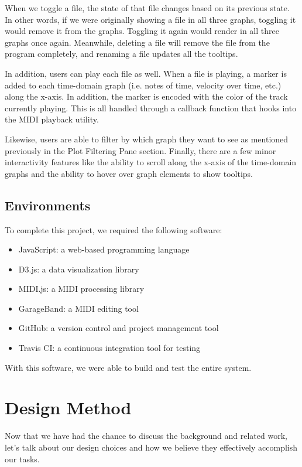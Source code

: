 \documentclass[journal]{vgtc}                %
\begin{document}
When we toggle a file, the state of that file changes based on its previous
state. In other words, if we were originally showing a file in all three graphs,
toggling it would remove it from the graphs. Toggling it again would render in
all three graphs once again. Meanwhile, deleting a file will remove the file
from the program completely, and renaming a file updates all the tooltips.

In addition, users can play each file as well. When a file is playing, a marker
is added to each time-domain graph (i.e. notes of time, velocity over time, etc.)
along the x-axis. In addition, the marker is encoded with the color of the
track currently playing. This is all handled through a callback function that
hooks into the MIDI playback utility.

Likewise, users are able to filter by which graph they want to see as mentioned
previously in the Plot Filtering Pane section. Finally, there are a few minor
interactivity features like the ability to scroll along the x-axis of the
time-domain graphs and the ability to hover over graph elements to show tooltips.

\subsection{Environments}

To complete this project, we required the following software:

\begin{itemize}
  \item JavaScript: a web-based programming language
  \item D3.js: a data visualization library
  \item MIDI.js: a MIDI processing library
  \item GarageBand: a MIDI editing tool
  \item GitHub: a version control and project management tool
  \item Travis CI: a continuous integration tool for testing
\end{itemize}

With this software, we were able to build and test the entire system.

\section{Design Method}

Now that we have had the chance to discuss the background and related work,
let's talk about our design choices and how we believe they effectively
accomplish our tasks.
\end{document}
